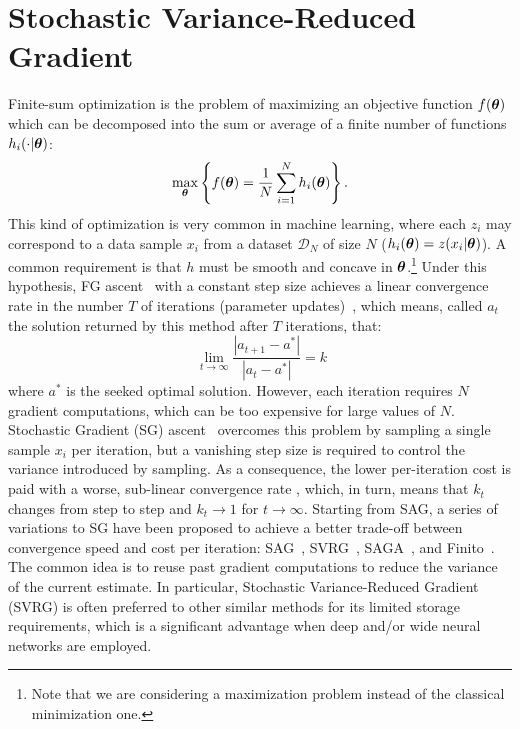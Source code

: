 \section{Stochastic Variance-Reduced Gradient}\label{sec:svrg}
\vspace{-0.05in}
Finite-sum optimization is the problem of maximizing an objective function $f(\boldsymbol{\theta})$ which can be decomposed into the sum or average of a finite number of functions $h_i(\cdot|\boldsymbol{\theta})$:
\begin{align*}
        \max_{\boldsymbol{\theta}} \left\{ f(\boldsymbol{\theta}) = \frac{1}{N}\sum_{i=1}^{N}h_i(\boldsymbol{\theta})\right\}.
\end{align*}
This kind of optimization is very common in machine learning, where each $z_i$ may correspond to a data sample $x_i$ from a dataset $\mathcal{D}_N$ of size $N$ (\ie $h_i(\boldsymbol{\theta}) = z(x_i|\boldsymbol{\theta})$). 
A common requirement is that $h$ must be smooth and concave in $\boldsymbol{\theta}$.\footnote{Note that we are considering a maximization problem instead of the classical minimization one.} 
Under this hypothesis, \acs{FG} ascent~\citep{cauchy1847methode} with a constant step size achieves a linear convergence rate in the number $T$ of iterations (\ie parameter updates)~\citep{nesterov2013introductory}, which means, called $a_t$ the solution returned by this method after $T$ iterations, that:
\[
\ \lim_{t\rightarrow \infty}\frac{|a_{t+1}-a^*|}{|a_t-a^*|}=k
\]
where $a^*$ is the seeked optimal solution.\newline
However, each iteration requires $N$ gradient computations, which can be too expensive for large values of $N$. Stochastic Gradient (\acs{SG}) ascent~\citep[\eg][]{robbins1951stochastic,bottou2004large} overcomes this problem by sampling a single sample $x_i$ per iteration, but a vanishing step size is required to control the variance introduced by sampling. As a consequence, the lower per-iteration cost is paid with a worse, sub-linear convergence rate \citep{nemirovskii1983problem}, which, in turn, means that $k_t$ changes from step to step and $k_t\rightarrow 1$ for $t \rightarrow \infty$.\newline
Starting from \acs{SAG}, a series of variations to \acs{SG} have been proposed to achieve a better trade-off between convergence speed and cost per iteration: \eg \acs{SAG}~\citep{roux2012stochastic}, \acs{SVRG}~\citep{johnson2013accelerating}, \acs{SAGA}~\citep{defazio2014saga}, and Finito~\citep{defazio2014finito}. 
The common idea is to reuse past gradient computations to reduce the variance of the current estimate.
In particular, Stochastic Variance-Reduced Gradient (\acs{SVRG}) is often preferred to other similar methods for its limited storage requirements, which is a significant advantage when deep and/or wide neural networks are employed.


